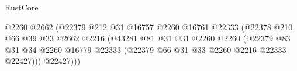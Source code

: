 \begin{lexlean}{RustCore}
\begin{coremodule}
                                                          @2260
                                                          @2662
                                                          (@22379
                                                            @212
                                                            @31
                                                            @16757
                                                            @2260
                                                            @16761
                                                            @22333
                                                            (@22378
                                                              @210
                                                              @66
                                                              @39
                                                              @33
                                                              @2662
                                                              @2216
                                                              (@43281
                                                                @81
                                                                @31
                                                                @31
                                                                @2260
                                                                @2260
                                                                (@22379
                                                                  @83
                                                                  @31
                                                                  @34
                                                                  @2260
                                                                  @16779
                                                                  @22333
                                                                  (@22379
                                                                    @66
                                                                    @31
                                                                    @33
                                                                    @2260
                                                                    @2216
                                                                    @22333
                                                                    @22427)))
                                                              @22427)))

\end{coremodule}
\end{lexlean}
